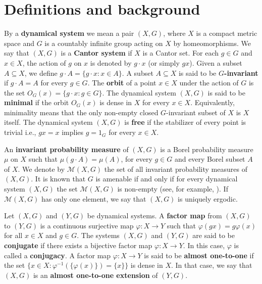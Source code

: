 \documentclass[titlepage,reqno,10pt]{amsart}
\theoremstyle{definition}
\begin{document}
\section{Definitions and background}\label{Background}
By a \textbf{dynamical system} we mean a pair $(X, G)$, where $X$ is a compact metric space and $G$ is a countably infinite group acting on $X$ by homeomorphisms. We say that $(X,G)$ is a \textbf{Cantor system} if $X$ is a Cantor set. For each $g \in G$ and $x \in X$, the action of $g$ on $x$ is denoted by $g \cdot x$ (or simply $gx$). Given a subset $A \subseteq X$, we define $g \cdot A = \{g \cdot x : x \in A\}$. A subset $A \subseteq X$ is said to be \textbf{$G$-invariant} if $g \cdot A = A$ for every $g \in G$. The \textbf{orbit} of a point $x \in X$ under the action of $G$ is the set $O_G(x) = \{g \cdot x : g \in G\}$. The dynamical system $(X, G)$ is said to be \textbf{minimal} if the orbit $O_G(x)$ is dense in $X$ for every $x \in X$. Equivalently, minimality means that the only non-empty closed $G$-invariant subset of $X$ is $X$ itself. The dynamical system $(X,G)$ is \textbf{free} if the stabilizer of every point is trivial i.e., $gx=x$ implies $g=1_G$ for every $x\in X$.


 An \textbf{invariant probability measure} of $(X,G)$ is a Borel probability measure $\mu$ on $X$ such that $\mu(g\cdot A)=\mu(A)$, for every $g\in G$ and every Borel subset $A$ of $X$. We denote by $\mathcal{M}(X,G)$ the set of all invariant probability measures of $(X,G)$. It is known that  $G$ is amenable if and only if for every dynamical system $(X,G)$ the set $\mathcal{M}(X,G)$ is non-empty (see, for example, \cite{KL16}). If $\mathcal{M}(X,G)$ has only one element, we say that $(X,G)$ is uniquely ergodic.

Let $(X, G)$ and $(Y, G)$ be dynamical systems. A \textbf{factor map} from $(X, G)$ to $(Y, G)$ is a continuous surjective map $\varphi: X \to Y$ such that $\varphi(gx) = g\varphi(x)$ for all $ x \in X$  and  $g \in G$. The systems $(X, G)$ and $(Y, G)$ are said to be \textbf{conjugate} if there exists a bijective factor map $\varphi: X \to Y$. In this case, $\varphi$ is called a \textbf{conjugacy}. A factor map $\varphi: X \to Y$ is said to be \textbf{almost one-to-one} if the set $\{x \in X : \varphi^{-1}(\{\varphi(x)\}) = \{x\}\}$ is dense in $X$. In that case, we say that $(X, G)$ is an \textbf{almost one-to-one extension} of $(Y, G)$.
\end{document}

